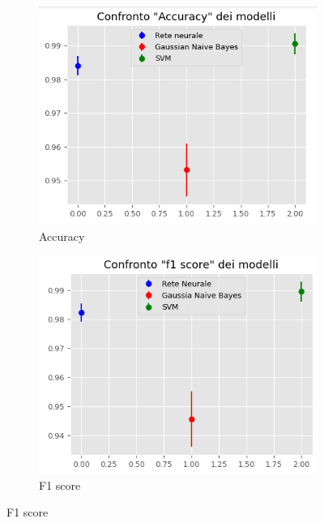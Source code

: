 \begin{figure}[!ht]
    \centering
    \begin{subfigure}[b]{0.4\textwidth}
        \centering
        \includegraphics[width=\textwidth]{img/ris/accuracy_inter_pca.png}
        \caption{Accuracy}
        \label{fig:acc_pca}
    \end{subfigure}
    \hfill
    \begin{subfigure}[b]{0.4\textwidth}
        \centering
        \includegraphics[width=\textwidth]{img/ris/fscore_inter_pca.png}
        \caption{F1 score}
        \label{fig:f1_pca}
    \end{subfigure}
    \hfill

\end{figure}

